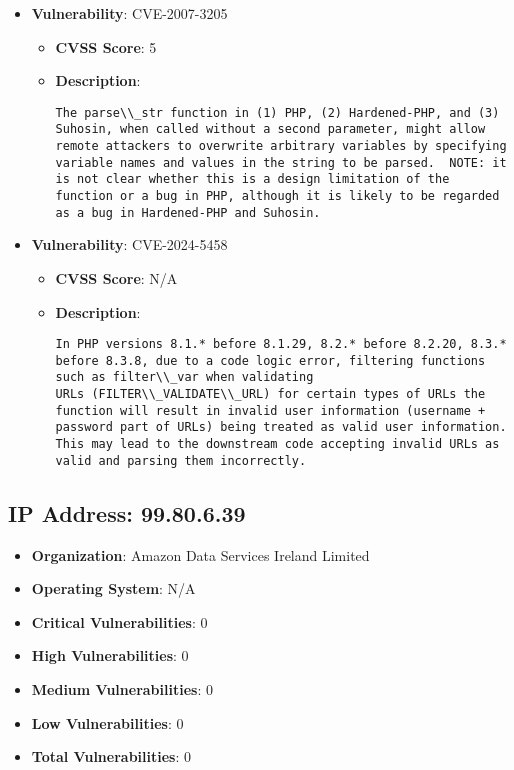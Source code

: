 \documentclass{article}
\begin{document}
\begin{itemize}
        \item \textbf{Vulnerability}: CVE-2007-3205
        \begin{itemize}
            \item \textbf{CVSS Score}:  5 
            \item \textbf{Description}:
            \parbox[t]{0.9\linewidth}{
                \verb|The parse\\_str function in (1) PHP, (2) Hardened-PHP, and (3) Suhosin, when called without a second parameter, might allow remote attackers to overwrite arbitrary variables by specifying variable names and values in the string to be parsed.  NOTE: it is not clear whether this is a design limitation of the function or a bug in PHP, although it is likely to be regarded as a bug in Hardened-PHP and Suhosin.|
            }
        \end{itemize}
    
        \item \textbf{Vulnerability}: CVE-2024-5458
        \begin{itemize}
            \item \textbf{CVSS Score}:  N/A 
            \item \textbf{Description}:
            \parbox[t]{0.9\linewidth}{
                \verb|In PHP versions 8.1.* before 8.1.29, 8.2.* before 8.2.20, 8.3.* before 8.3.8, due to a code logic error, filtering functions such as filter\\_var when validating URLs (FILTER\\_VALIDATE\\_URL) for certain types of URLs the function will result in invalid user information (username + password part of URLs) being treated as valid user information. This may lead to the downstream code accepting invalid URLs as valid and parsing them incorrectly.|
            }
        \end{itemize}
    
\end{itemize}




\clearpage



\subsection*{IP Address: 99.80.6.39}

\begin{itemize}
    \item \textbf{Organization}: Amazon Data Services Ireland Limited
    \item \textbf{Operating System}:  N/A 
    \item \textbf{Critical Vulnerabilities}: 0
    \item \textbf{High Vulnerabilities}: 0
    \item \textbf{Medium Vulnerabilities}: 0
    \item \textbf{Low Vulnerabilities}: 0
    \item \textbf{Total Vulnerabilities}: 0
\end{itemize}
\end{document}
